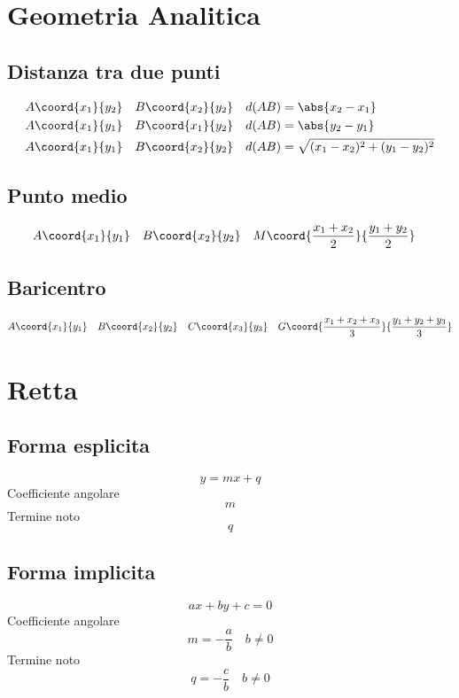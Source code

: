 \chapter{Geometria Analitica}
\section{Distanza tra due punti}
\begin{align}
A\coord{x_1}{y_2}&& B\coord{x_2}{y_2}&&&  d(AB)=\abs{x_2-x_1}\\
A\coord{x_1}{y_1} && B\coord{x_1}{y_2}&&&  d(AB)=\abs{y_2-y_1}\\
A\coord{x_1}{y_1} && B\coord{x_2}{y_2}&&&  d(AB)=\sqrt{(x_1-x_2)^2+(y_1-y_2)^2}
\end{align}
\section{Punto medio}
\begin{align}
A\coord{x_1}{y_1}&& B\coord{x_2}{y_2}&&& M\coord{\dfrac{x_1+x_2}{2}}{\dfrac{y_1+y_2}{2}}
\end{align}
\section{Baricentro}
\begin{align}
A\coord{x_1}{y_1}& &B\coord{x_2}{y_2}&&C\coord{x_3}{y_3}&& G\coord{\dfrac{x_1+x_2+x_3}{3}}{\dfrac{y_1+y_2+y_3}{3}}
\end{align}
\chapter{Retta}
\section{Forma esplicita}
\begin{equation}
y=mx+q
\end{equation}
Coefficiente angolare
\begin{equation}
m
\end{equation}
Termine noto
\begin{equation}
q
\end{equation}
\section{Forma implicita}
\begin{equation}
ax+by+c=0
\end{equation}
Coefficiente angolare
\begin{equation}
m=-\dfrac{a}{b}\quad b\neq 0
\end{equation}
Termine noto
\begin{equation}
q=-\dfrac{c}{b}\quad b\neq 0
\end{equation}
